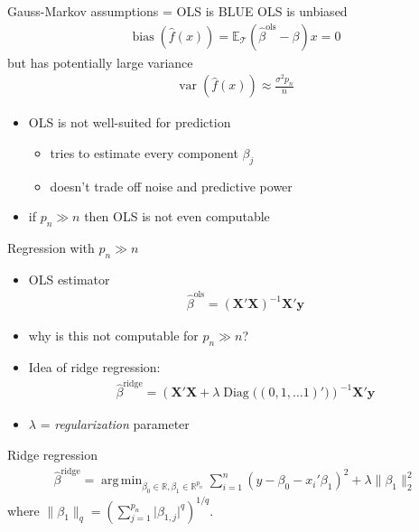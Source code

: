 \documentclass[xcolor=dvipsnames, handout]{beamer}
\newcommand{\E}{\mathbb{E}}
\DeclareMathOperator{\bias}{bias}
\DeclareMathOperator{\var}{var}
\DeclareMathOperator{\diag}{Diag}
\DeclareMathOperator{\argmin}{arg\,min}
\begin{document}
\begin{frame}{Gauss-Markov assumptions = OLS is BLUE}
OLS is unbiased 
\begin{align*}
  \bias \left(\hat{f}(x) \right) = \E_{\mathcal{T}} \left(\hat{\beta}^{\text{ols}} - \beta \right) x = 0
\end{align*}
but has potentially large variance
\begin{align*}
  \var \left(\hat{f} (x) \right) \approx \frac{\sigma^2 p_n}{n}
\end{align*}
\begin{itemize}[<+->]
  \item OLS is not well-suited for prediction
  \begin{itemize}
    \item
    tries to estimate every component $\beta_j$
    \item 
    doesn't trade off noise and predictive power
  \end{itemize}
  \item if $p_n \gg n$ then OLS is not even computable
\end{itemize}
\end{frame}


\begin{frame}{Regression with $p_n \gg n$}
\begin{itemize}[<+->]
  \item OLS estimator
  \begin{align*}
    \hat{\beta}^{\text{ols}} = \left(\mathbf{X}'\mathbf{X}\right)^{-1} \mathbf{X}' \mathbf{y}
  \end{align*}
  \item why is this not computable for $p_n \gg n$?
  \pause
  \item Idea of ridge regression:
  \begin{align*}
    \hat{\beta}^{\text{ridge}} = \left(\mathbf{X}'\mathbf{X} + \lambda \diag\big((0, 1, \dotsc 1)'\big) \right)^{-1} \mathbf{X}' \mathbf{y}
  \end{align*}
  \item $\lambda$ = \emph{regularization} parameter
\end{itemize}
\end{frame}


\begin{frame}{Ridge regression}
\begin{align*}
  \hat{\beta}^{\text{ridge}} = \argmin_{\beta_0 \in \mathbb{R}, \beta_1 \in \mathbb{R}^{p_n}} \sum_{i=1}^n \left(y - \beta_0 - x_i'\beta_1\right)^2 + \lambda \lVert \beta_1 \rVert_2^2 
\end{align*}
where $\lVert \beta_1 \rVert_q = \left(\sum_{j=1}^{p_n} \lvert \beta_{1, j} \rvert^q \right)^{1/q}$.
\end{frame}
\end{document}
